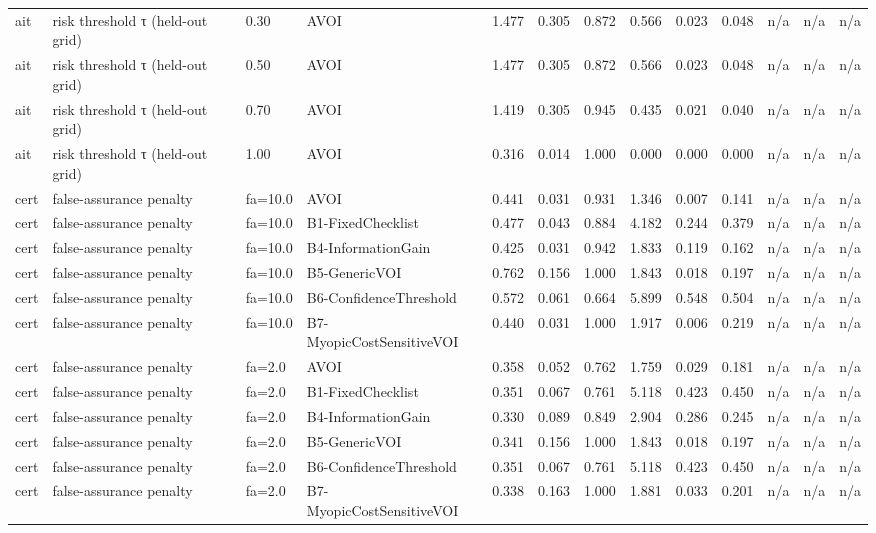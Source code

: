 \begin{table}[!ht]
{\begin{tabular}{lllllllllllll}
ait & risk threshold τ (held-out grid) & 0.30 & AVOI & 1.477 & 0.305 & 0.872 & 0.566 & 0.023 & 0.048 & n/a & n/a & n/a \\
ait & risk threshold τ (held-out grid) & 0.50 & AVOI & 1.477 & 0.305 & 0.872 & 0.566 & 0.023 & 0.048 & n/a & n/a & n/a \\
ait & risk threshold τ (held-out grid) & 0.70 & AVOI & 1.419 & 0.305 & 0.945 & 0.435 & 0.021 & 0.040 & n/a & n/a & n/a \\
ait & risk threshold τ (held-out grid) & 1.00 & AVOI & 0.316 & 0.014 & 1.000 & 0.000 & 0.000 & 0.000 & n/a & n/a & n/a \\
cert & false-assurance penalty & fa=10.0 & AVOI & 0.441 & 0.031 & 0.931 & 1.346 & 0.007 & 0.141 & n/a & n/a & n/a \\
cert & false-assurance penalty & fa=10.0 & B1-FixedChecklist & 0.477 & 0.043 & 0.884 & 4.182 & 0.244 & 0.379 & n/a & n/a & n/a \\
cert & false-assurance penalty & fa=10.0 & B4-InformationGain & 0.425 & 0.031 & 0.942 & 1.833 & 0.119 & 0.162 & n/a & n/a & n/a \\
cert & false-assurance penalty & fa=10.0 & B5-GenericVOI & 0.762 & 0.156 & 1.000 & 1.843 & 0.018 & 0.197 & n/a & n/a & n/a \\
cert & false-assurance penalty & fa=10.0 & B6-ConfidenceThreshold & 0.572 & 0.061 & 0.664 & 5.899 & 0.548 & 0.504 & n/a & n/a & n/a \\
cert & false-assurance penalty & fa=10.0 & B7-MyopicCostSensitiveVOI & 0.440 & 0.031 & 1.000 & 1.917 & 0.006 & 0.219 & n/a & n/a & n/a \\
cert & false-assurance penalty & fa=2.0 & AVOI & 0.358 & 0.052 & 0.762 & 1.759 & 0.029 & 0.181 & n/a & n/a & n/a \\
cert & false-assurance penalty & fa=2.0 & B1-FixedChecklist & 0.351 & 0.067 & 0.761 & 5.118 & 0.423 & 0.450 & n/a & n/a & n/a \\
cert & false-assurance penalty & fa=2.0 & B4-InformationGain & 0.330 & 0.089 & 0.849 & 2.904 & 0.286 & 0.245 & n/a & n/a & n/a \\
cert & false-assurance penalty & fa=2.0 & B5-GenericVOI & 0.341 & 0.156 & 1.000 & 1.843 & 0.018 & 0.197 & n/a & n/a & n/a \\
cert & false-assurance penalty & fa=2.0 & B6-ConfidenceThreshold & 0.351 & 0.067 & 0.761 & 5.118 & 0.423 & 0.450 & n/a & n/a & n/a \\
cert & false-assurance penalty & fa=2.0 & B7-MyopicCostSensitiveVOI & 0.338 & 0.163 & 1.000 & 1.881 & 0.033 & 0.201 & n/a & n/a & n/a \\

\end{tabular}}
\end{table}
